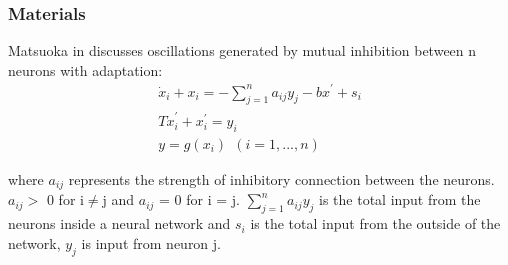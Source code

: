 \documentclass{beamer}
\begin{document}

	\begin{frame}
		\frametitle{Materials} 
	
		Matsuoka in \cite{matsuoka1985sustained} discusses oscillations generated by mutual inhibition between n neurons with adaptation:
		\begin{equation}\label{eq:Mats2}
		\begin{split}
		\dot{x}_i + x_i = - \sum^n_{j = 1} a_{ij} y_j - b x^{\prime} + s_i\\
		T \dot{x}^{\prime}_i  + x^{\prime}_i= y_i\\
		y = g(x_i)\ \ (i = 1,...,n) 
		\end{split}
		\end{equation}
		
		where $a_{ij}$ represents the strength of inhibitory connection between the neurons. $a_{ij} >$ 0 for i$\neq$j and $a_{ij}$ = 0 for i = j. $\sum^n_{j = 1} a_{ij} y_j $ is the total input from the neurons inside a neural network and $s_{i}$ is the total input from the outside of the network, $y_j$ is input from neuron j. 
	\end{frame}
	
\end{document}
